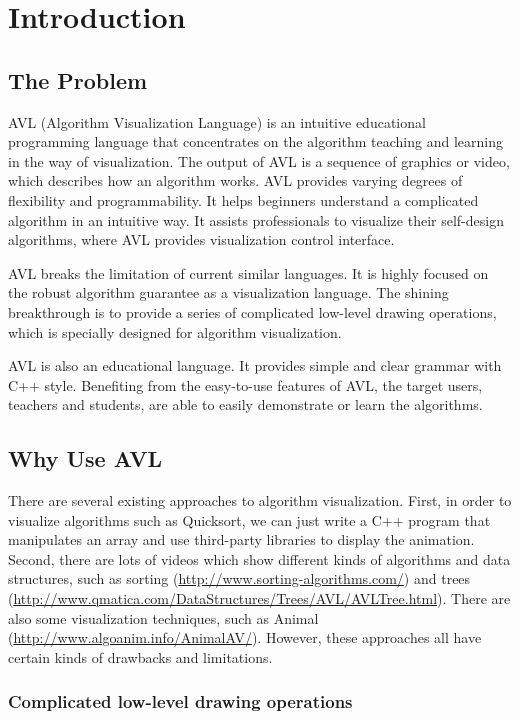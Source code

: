 \section{Introduction}

\subsection{The Problem}
   
AVL (Algorithm Visualization Language) is an intuitive educational programming language that
concentrates on the algorithm teaching and learning in the way of visualization. The output of AVL
is a sequence of graphics or video, which describes how an algorithm works. AVL provides varying
degrees of flexibility and programmability. It helps beginners understand a complicated algorithm in
an intuitive way. It assists professionals to visualize their self-design algorithms, where AVL
provides visualization control interface.
    
AVL breaks the limitation of current similar languages. It is highly focused on the robust algorithm
guarantee as a visualization language. The shining breakthrough is to provide a series of
complicated low-level drawing operations, which is specially designed for algorithm visualization.
	 
AVL is also an educational language. It provides simple and clear grammar with C++ style. Benefiting
from the easy-to-use features of AVL, the target users, teachers and students, are able to easily
demonstrate or learn the algorithms.
	  
	   
\subsection{Why Use AVL}
	    
There are several existing approaches to algorithm visualization. First, in order to visualize
algorithms such as Quicksort, we can just write a C++ program that manipulates an array and use
third-party libraries to display the animation. Second, there are lots of videos which show
different kinds of algorithms and data structures, such as sorting
(\url{http://www.sorting-algorithms.com/}) and trees
(\url{http://www.qmatica.com/DataStructures/Trees/AVL/AVLTree.html}). There are also some
visualization techniques, such as Animal (\url{http://www.algoanim.info/AnimalAV/}). However, these
approaches all have certain kinds of drawbacks and limitations.
		 
\subsubsection{Complicated low-level drawing operations}

